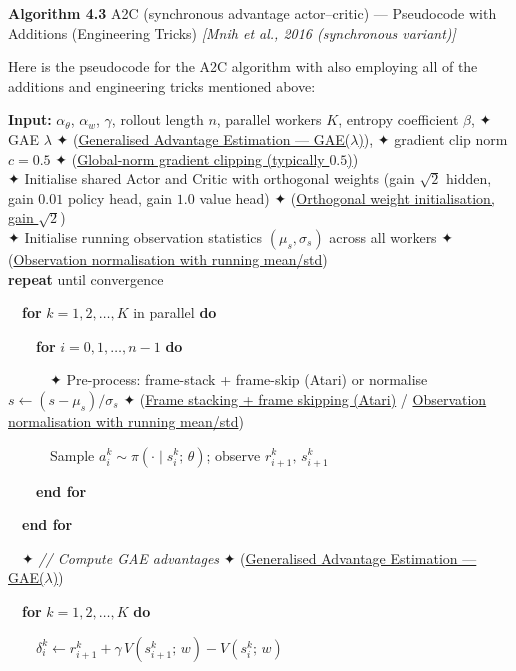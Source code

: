 \documentclass[11pt]{article}
\begin{document}
    \begin{pseudobox}

\textbf{Algorithm 4.3} A2C (synchronous advantage actor--critic) ---
Pseudocode with Additions (Engineering Tricks) \emph{{[}Mnih et al.,
2016 (synchronous variant){]}}

\tcbline

Here is the pseudocode for the A2C algorithm with also employing all of
the additions and engineering tricks mentioned above:

\textbf{Input:} \(\alpha_\theta\), \(\alpha_w\), \(\gamma\), rollout
length \(n\), parallel workers \(K\), entropy coefficient \(\beta\), ✦
GAE \(\lambda\) ✦ (\hyperref[trick-4-3-1]{Generalised Advantage
Estimation --- GAE(\(\lambda\))}), ✦ gradient clip norm \(c = 0.5\) ✦
(\hyperref[trick-4-3-5]{Global-norm gradient clipping (typically
\(0.5\))})\\
✦ Initialise shared Actor and Critic with orthogonal weights (gain
\(\sqrt{2}\) hidden, gain \(0.01\) policy head, gain \(1.0\) value head)
✦ (\hyperref[trick-4-3-2]{Orthogonal weight initialisation, gain
\(\sqrt{2}\)})\\
✦ Initialise running observation statistics \((\mu_s, \sigma_s)\) across
all workers ✦ (\hyperref[trick-4-3-3]{Observation normalisation with
running mean/std})\\
\textbf{repeat} until convergence\\
\strut ~~\textbf{for} \(k = 1, 2, \ldots, K\) in parallel \textbf{do}\\
\strut ~~~~\textbf{for} \(i = 0, 1, \ldots, n - 1\) \textbf{do}\\
\strut ~~~~~~✦ Pre-process: frame-stack + frame-skip (Atari) or
normalise \(s \leftarrow (s - \mu_s)/\sigma_s\) ✦
(\hyperref[trick-4-3-6]{Frame stacking + frame skipping (Atari)} /
\hyperref[trick-4-3-3]{Observation normalisation with running
mean/std})\\
\strut ~~~~~~Sample \(a_i^{k} \sim \pi(\cdot \mid s_i^{k};\, \theta)\);
observe \(r_{i+1}^{k},\, s_{i+1}^{k}\)\\
\strut ~~~~\textbf{end for}\\
\strut ~~\textbf{end for}\\
\strut ~~✦ \emph{// Compute GAE advantages} ✦
(\hyperref[trick-4-3-1]{Generalised Advantage Estimation ---
GAE(\(\lambda\))})\\
\strut ~~\textbf{for} \(k = 1, 2, \ldots, K\) \textbf{do}\\
\strut ~~~~\(\delta_i^k \leftarrow r_{i+1}^k + \gamma\, V(s_{i+1}^k;\, w) - V(s_i^k;\, w)\)\\

\end{pseudobox}
\end{document}
